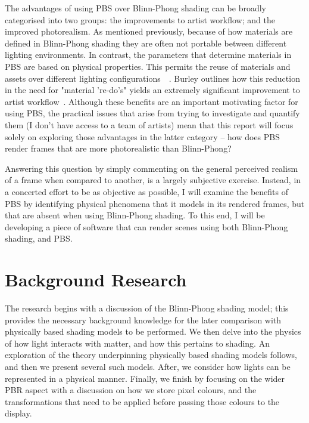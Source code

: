 The advantages of using PBS over Blinn-Phong shading can be broadly categorised into two groups: the improvements to artist workflow; and the improved photorealism. As mentioned previously, because of how materials are defined in Blinn-Phong shading they are often not portable between different lighting environments. In contrast, the parameters that determine materials in PBS are based on physical properties. This permits the reuse of materials and assets over different lighting configurations~\cite{MovingFrostbitetoPBR}~\cite{SIGGRAPH2020Course}. Burley outlines how this reduction in the need for "material 're-do's" yields an extremely significant improvement to artist workflow~\cite{Burley2012Physically}. Although these benefits are an important motivating factor for using PBS, the practical issues that arise from trying to investigate and quantify them (I don’t have access to a team of artists) mean that this report will focus solely on exploring those advantages in the latter category – how does PBS render frames that are more photorealistic than Blinn-Phong?

Answering this question by simply commenting on the general perceived realism of a frame when compared to another, is a largely subjective exercise. Instead, in a concerted effort to be as objective as possible, I will examine the benefits of PBS by identifying physical phenomena that it models in its rendered frames, but that are absent when using Blinn-Phong shading. To this end, I will be developing a piece of software that can render scenes using both Blinn-Phong shading, and PBS.

\section{Background Research}

The research begins with a discussion of the Blinn-Phong shading model; this provides the necessary background knowledge for the later comparison with physically based shading models to be performed. We then delve into the physics of how light interacts with matter, and how this pertains to shading. An exploration of the theory underpinning physically based shading models follows, and then we present several such models. After, we consider how lights can be represented in a physical manner. Finally, we finish by focusing on the wider PBR aspect with a discussion on how we store pixel colours, and the transformations that need to be applied before passing those colours to the display.

